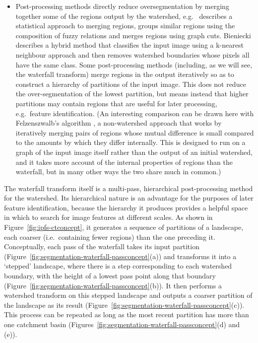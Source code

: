 \documentclass[preprint,a4paper]{elsarticle}
\begin{document}
\begin{itemize}
\item Post-processing methods \cite{bieniecki04,duarte05,frucci06,gies04,patino05,stawiaski08} directly reduce oversegmentation by merging together some of the regions output by the watershed, e.g.~\cite{gies04} describes a statistical approach to merging regions, \cite{patino05} groups similar regions using the composition of fuzzy relations and \cite{stawiaski08} merges regions using graph cuts. Bieniecki \cite{bieniecki04} describes a hybrid method that classifies the input image using a k-nearest neighbour approach and then removes watershed boundaries whose pixels all have the same class. Some post-processing methods (including, as we will see, the waterfall transform) merge regions in the output iteratively so as to construct a hierarchy of partitions of the input image. This does not reduce the over-segmentation of the lowest partition, but means instead that higher partitions may contain regions that are useful for later processing, e.g.~feature identification. (An interesting comparison can be drawn here with Felzenszwalb's algorithm \cite{felzenszwalb03}, a non-watershed approach that works by iteratively merging pairs of regions whose mutual difference is small compared to the amounts by which they differ internally. This is designed to run on a graph of the input image itself rather than the output of an initial watershed, and it takes more account of the internal properties of regions than the waterfall, but in many other ways the two share much in common.)

\end{itemize}
%
The waterfall transform itself is a multi-pass, hierarchical post-processing method for the watershed. Its hierarchical nature is an advantage for the purposes of later feature identification, because the hierarchy it produces provides a helpful space in which to search for image features at different scales. As shown in Figure~\ref{fig:ipfs-ctconcept}, it generates a sequence of partitions of a landscape, each coarser (i.e.~containing fewer regions) than the one preceding it. Conceptually, each pass of the waterfall takes its input partition (Figure~\ref{fig:segmentation-waterfall-passconcept}(a)) and transforms it into a `stepped' landscape, where there is a step corresponding to each watershed boundary, with the height of a lowest pass point along that boundary (Figure~\ref{fig:segmentation-waterfall-passconcept}(b)). It then performs a watershed transform on this stepped landscape and outputs a coarser partition of the landscape as its result (Figure~\ref{fig:segmentation-waterfall-passconcept}(c)). This process can be repeated as long as the most recent partition has more than one catchment basin (Figures~\ref{fig:segmentation-waterfall-passconcept}(d) and (e)).
\end{document}
